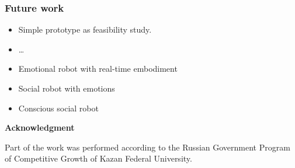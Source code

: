 \documentclass[12pt, aspectratio=169]{beamer}
\begin{document}


\begin{frame}
  \frametitle{Future work}
  
\begin{itemize}
  \item Simple prototype as feasibility study.
  \item \ldots\
  \item Emotional robot with real-time embodiment
  \item Social robot with emotions
  \item Conscious social robot
\end{itemize}

\textbf{Acknowledgment}

Part of the work was performed according to the Russian Government Program of Competitive Growth of Kazan Federal University.

\end{frame}



\end{document}
